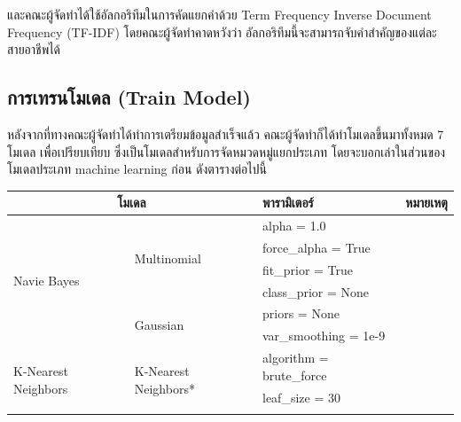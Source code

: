 และคณะผู้จัดทำได้ใช้อัลกอริทึมในการคัดแยกคำด้วย Term Frequency Inverse Document Frequency (TF-IDF) โดยคณะผู้จัดทำคาดหวังว่า
อัลกอริทึมนี้จะสามารถจับคำสำคัญของแต่ละสายอาชีพได้

\subsection{การเทรนโมเดล (Train Model)}
หลังจากที่ทางคณะผู้จัดทำได้ทำการเตรียมข้อมูลสำเร็จแล้ว คณะผู้จัดทำก็ได้ทำโมเดลขึ้นมาทั้งหมด 7 โมเดล เพื่อเปรียบเทียบ
ซึ่งเป็นโมเดลสำหรับการจัดหมวดหมู่แยกประเภท โดยจะบอกเล่าในส่วนของโมเดลประเภท machine learning ก่อน ดังตารางต่อไปนี้
\begin{table}[H]
    \begin{tabularx}{\textwidth}{|l|l|X|X|} \hline
        \multicolumn{2}{|c|}{โมเดล}                                   & พารามิเตอร์                       & หมายเหตุ                                                       \\ \hline
        \multirow{6}{*}{Navie Bayes}                                 & \multirow{4}{*}{Multinomial}    & alpha = 1.0              &                                    \\ \cline{3-4}
                                                                     &                                 & force\_alpha = True      &                                    \\ \cline{3-4}
                                                                     &                                 & fit\_prior = True        &                                    \\ \cline{3-4}
                                                                     &                                 & class\_prior = None      &                                    \\ \cline{2-4}
                                                                     & \multirow{2}{*}{Gaussian}       & priors = None            &                                    \\ \cline{3-4}
                                                                     &                                 & var\_smoothing = 1e-9    &                                    \\ \hline
        \multirow{7}{*}{K-Nearest Neighbors}                                 & \multirow{6}{*}{K-Nearest Neighbors*}   & algorithm = brute\_force &                                    \\ \cline{3-4}
                                                                     &                                 & leaf\_size = 30          &                                    \\ \cline{3-4}

\end{tabularx}
\end{table}
